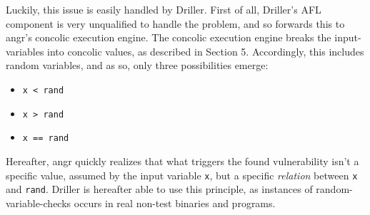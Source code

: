 \documentclass[a4paper]{article}
\newcommand{\tit}[1]{\textit{#1}}
\newcommand{\ttt}[1]{\texttt{#1}}
\begin{document}
Luckily, this issue is easily handled by Driller. First of all, Driller's AFL component is very unqualified to handle the problem, and so forwards this to angr's concolic execution engine. The concolic execution engine breaks the input-variables into concolic values, as described in Section 5. Accordingly, this includes random variables, and as so, only three possibilities emerge:
\begin{itemize}[noitemsep]
	\item \ttt{x < rand}
	\item \ttt{x > rand}
	\item \ttt{x == rand}
\end{itemize}
Hereafter, angr quickly realizes that what triggers the found vulnerability isn't a specific value, assumed by the input variable \ttt{x}, but a specific \tit{relation} between \ttt{x} and \ttt{rand}. Driller is hereafter able to use this principle, as instances of random-variable-checks occurs in real non-test binaries and programs.
\end{document}
